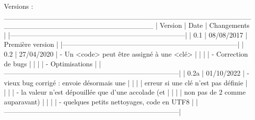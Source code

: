 Versions :
 _____________________________________________________________________________
| Version |    Date    | Changements                                          |
|-----------------------------------------------------------------------------|
|   0.1   | 08/08/2017 | Première version                                     |
|-----------------------------------------------------------------------------|
|   0.2   | 27/04/2020 | - Un <code> peut être assigné à une <clé>            |
|         |            | - Correction de bugs                                 |
|         |            | - Optimisations                                      |
|-----------------------------------------------------------------------------|
|   0.2a  | 01/10/2022 | - vieux bug corrigé : \useKV envoie désormais une    |
|         |            |   erreur si une clé n'est pas définie                |
|         |            | - la valeur n'est dépouillée que d'une accolade (et  |
|         |            |   non pas de 2 comme auparavant)                     |
|         |            | - quelques petits nettoyages, code en UTF8           |
|-----------------------------------------------------------------------------|